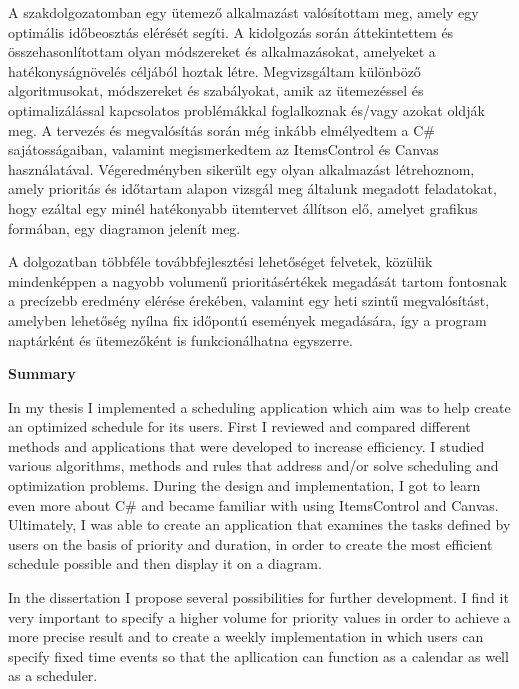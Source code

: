 
A szakdolgozatomban egy ütemező alkalmazást valósítottam meg, amely egy optimális időbeosztás elérését segíti. A kidolgozás során áttekintettem és összehasonlítottam olyan módszereket és alkalmazásokat, amelyeket a hatékonyságnövelés céljából hoztak létre. Megvizsgáltam különböző algoritmusokat, módszereket és szabályokat, amik az ütemezéssel és optimalizálással kapcsolatos problémákkal foglalkoznak és/vagy azokat oldják meg. A tervezés és megvalósítás során még inkább elmélyedtem a C\# sajátosságaiban, valamint megismerkedtem az ItemsControl és Canvas használatával. Végeredményben sikerült egy olyan alkalmazást létrehoznom, amely prioritás és időtartam alapon vizsgál meg általunk megadott feladatokat, hogy ezáltal egy minél hatékonyabb ütemtervet állítson elő, amelyet grafikus formában, egy diagramon jelenít meg.

A dolgozatban többféle továbbfejlesztési lehetőséget felvetek, közülük mindenképpen a nagyobb volumenű prioritásértékek megadását tartom fontosnak a precízebb eredmény elérése érekében, valamint egy heti szintű megvalósítást, amelyben lehetőség nyílna fix időpontú események megadására, így a program naptárként és ütemezőként is funkcionálhatna egyszerre.

\newpage
\begin{LARGE}
\textbf{Summary}
\end{LARGE}
\vskip 1cm

In my thesis I implemented a scheduling application which aim was to help create an optimized schedule for its users. First I reviewed and compared different methods and applications that were developed to increase efficiency. I studied various algorithms, methods and rules that address and/or solve scheduling and optimization problems. During the design and implementation, I got to learn even more about C\# and became familiar with using ItemsControl and Canvas. Ultimately, I was able to create an application that examines the tasks defined by users on the basis of priority and duration, in order to create the most efficient schedule possible and then display it on a diagram.

In the dissertation I propose several possibilities for further development. I find it very important to specify a higher volume for priority values in order to achieve a more precise result and to create a weekly implementation in which users can specify fixed time events so that the apllication can function as a calendar as well as a scheduler.
